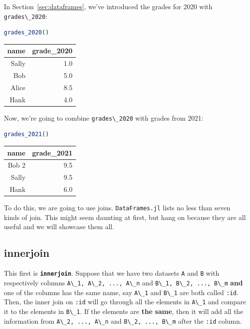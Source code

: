 \documentclass[
  notoc %
]{tufte-book}
\newcommand{\passthrough}[1]{#1}
\begin{document}
In Section~\ref{sec:dataframes}, we've introduced the grades for 2020
with \passthrough{\lstinline!grades\_2020!}:

\begin{lstlisting}[language=Julia]
grades_2020()
\end{lstlisting}

\begin{longtable}[]{@{}rr@{}}
\toprule
name & grade\_2020 \\
\midrule
\endhead
Sally & 1.0 \\
Bob & 5.0 \\
Alice & 8.5 \\
Hank & 4.0 \\
\bottomrule
\end{longtable}

Now, we're going to combine \passthrough{\lstinline!grades\_2020!} with
grades from 2021:

\begin{lstlisting}[language=Julia]
grades_2021()
\end{lstlisting}

\begin{longtable}[]{@{}rr@{}}
\toprule
name & grade\_2021 \\
\midrule
\endhead
Bob 2 & 9.5 \\
Sally & 9.5 \\
Hank & 6.0 \\
\bottomrule
\end{longtable}

To do this, we are going to use joins.
\passthrough{\lstinline!DataFrames.jl!} lists no less than seven kinds
of join. This might seem daunting at first, but hang on because they are
all useful and we will showcase them all.

\hypertarget{sec:innerjoin}{%
\subsection{innerjoin}\label{sec:innerjoin}}

This first is \textbf{\passthrough{\lstinline!innerjoin!}}. Suppose that
we have two datasets \passthrough{\lstinline!A!} and
\passthrough{\lstinline!B!} with respectively columns
\passthrough{\lstinline!A\_1, A\_2, ..., A\_n!} and
\passthrough{\lstinline!B\_1, B\_2, ..., B\_m!} \textbf{and} one of the
columns has the same name, say \passthrough{\lstinline!A\_1!} and
\passthrough{\lstinline!B\_1!} are both called
\passthrough{\lstinline!:id!}. Then, the inner join on
\passthrough{\lstinline!:id!} will go through all the elements in
\passthrough{\lstinline!A\_1!} and compare it to the elements in
\passthrough{\lstinline!B\_1!}. If the elements are \textbf{the same},
then it will add all the information from
\passthrough{\lstinline!A\_2, ..., A\_n!} and
\passthrough{\lstinline!B\_2, ..., B\_m!} after the
\passthrough{\lstinline!:id!} column.
\end{document}
